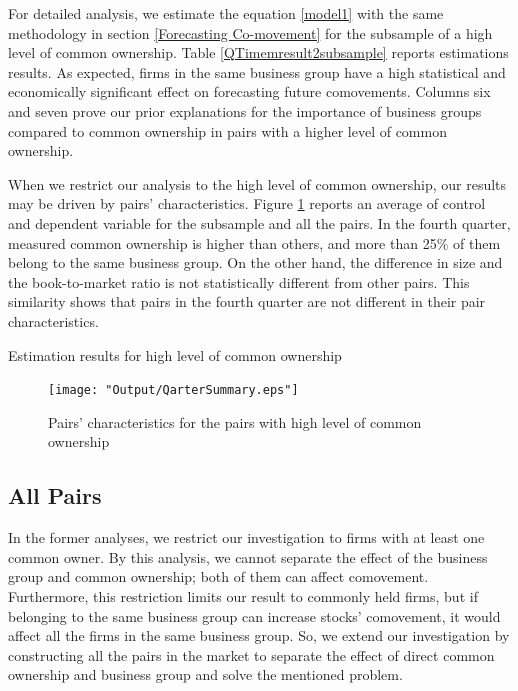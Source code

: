 \documentclass[12pt, a4paper]{article}
\begin{document}
For detailed analysis, we estimate the equation \ref{model1} with the same methodology in section \ref{Forecasting Co-movement}  for the subsample of a high level of common ownership. Table \ref{QTimemresult2subsample} reports estimations results. As expected, firms in the same business group have a high statistical and economically significant effect on forecasting future comovements. Columns six and seven prove our prior explanations for the importance of business groups compared to common ownership in pairs with a higher level of common ownership.

 When we restrict our analysis to the high level of common ownership, our results may be driven by pairs' characteristics. 
Figure \ref{QarterSummary} reports an average of control and dependent variable for the subsample and all the pairs. In the fourth quarter, measured common ownership is higher than others, and more than 25\% of them belong to the same business group. On the other hand, the difference in size and the book-to-market ratio is not statistically different from other pairs. This similarity shows that pairs in the fourth quarter are not different in their pair characteristics. 

\begin{table}[htbp]
	\centering
	\caption{\scriptsize Estimation results for high level of common ownership}
	\label{QTimemresult2subsample}
	\resizebox{0.75\textwidth}{!}{
		
	}
\end{table}
\begin{figure}[htbp]
	\centering  
	\texttt{[image: "Output/QarterSummary.eps"]}
	\caption{Pairs' characteristics for the pairs with high level of common ownership}
	\label{QarterSummary}
\end{figure}

\FloatBarrier

\subsection{All Pairs}
In the former analyses, we restrict our investigation to firms with at least one common owner. By this analysis, we cannot separate the effect of the business group and common ownership; both of them can affect comovement. Furthermore, this restriction limits our result to commonly held firms, but if belonging to the same business group can increase stocks' comovement, it would affect all the firms in the same business group. 
So, we extend our investigation by constructing all the pairs in the market to separate the effect of direct common ownership and business group and solve the mentioned problem. 
\end{document}
